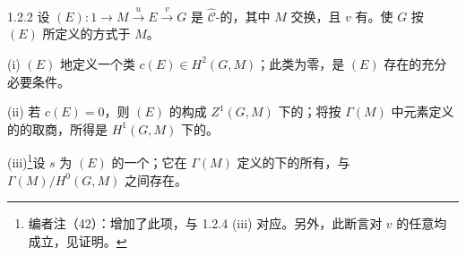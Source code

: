 \begin{SGAresult}{}{1.2.2}
设 $(E):1\to M\xrightarrow{u}E\xrightarrow{v}G$ 是 $\widehat{\mathcal C}$-的，其中 $M$ 交换，且 $v$ 有。使 $G$ 按 $(E)$ 所定义的方式于 $M$。

(i)  $(E)$ 地定义一个类 $c(E)\in H^2(G,M)$；此类为零，是 $(E)$ 存在的充分必要条件。

(ii) 若 $c(E)=0$，则 $(E)$ 的构成 $Z^1(G,M)$ 下的；将按 $\Gamma(M)$ 中元素定义的的取商，所得是 $H^1(G,M)$ 下的。

(iii)\footnote{编者注（42）：增加了此项，与 1.2.4 (iii) 对应。另外，此断言对 $v$ 的任意均成立，见证明。}设 $s$ 为 $(E)$ 的一个；它在 $\Gamma(M)$ 定义的下的所有，与 $\Gamma(M)/H^0(G,M)$ 之间存在。
\end{SGAresult}
